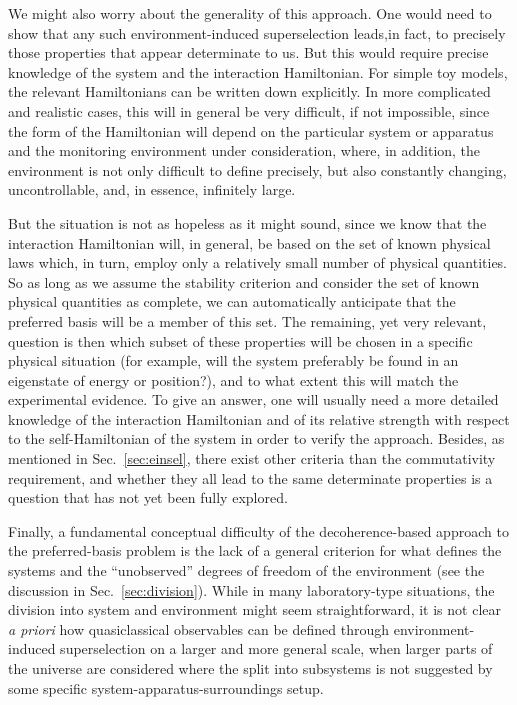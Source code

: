 \documentclass[rmp,aps,amsmath,amsfonts,noshowkeys,noshowpacs,12pt]{revtex4}
\begin{document}
We might also worry about the generality of this approach. One would
need to show that any such environment-induced superselection leads,in
fact, to precisely those properties that appear determinate to us. But
this would require precise knowledge of the system and the interaction
Hamiltonian.  For simple toy models, the relevant Hamiltonians can be
written down explicitly. In more complicated and realistic cases, this
will in general be very difficult, if not impossible, since the form
of the Hamiltonian will depend on the particular system or apparatus
and the monitoring environment under consideration, where, in
addition, the environment is not only difficult to define precisely,
but also constantly changing, uncontrollable, and, in essence,
infinitely large.

But the situation is not as hopeless as it might sound, since we know
that the interaction Hamiltonian will, in general, be based on the set
of known physical laws which, in turn, employ only a relatively small
number of physical quantities. So as long as we assume the stability
criterion and consider the set of known physical quantities as
complete, we can automatically anticipate that the preferred basis
will be a member of this set. The remaining, yet very relevant,
question is then which subset of these properties will be chosen in a
specific physical situation (for example, will the system preferably
be found in an eigenstate of energy or position?), and to what extent
this will match the experimental evidence. To give an answer, one will
usually need a more detailed knowledge of the interaction Hamiltonian
and of its relative strength with respect to the self-Hamiltonian of
the system in order to verify the approach.  Besides, as mentioned in
Sec.~\ref{sec:einsel}, there exist other criteria than the
commutativity requirement, and whether they all lead to the same
determinate properties is a question that has not yet been fully
explored.

Finally, a fundamental conceptual difficulty of the decoherence-based
approach to the preferred-basis problem is the lack of a general
criterion for what defines the systems and the ``unobserved'' degrees
of freedom of the environment (see the discussion in
Sec.~\ref{sec:division}). While in many laboratory-type situations,
the division into system and environment might seem straightforward,
it is not clear {\em a priori} how quasiclassical observables can be
defined through environment-induced superselection on a larger and
more general scale, when larger parts of the universe are considered
where the split into subsystems is not suggested by some specific
system-apparatus-surroundings setup.
\end{document}
